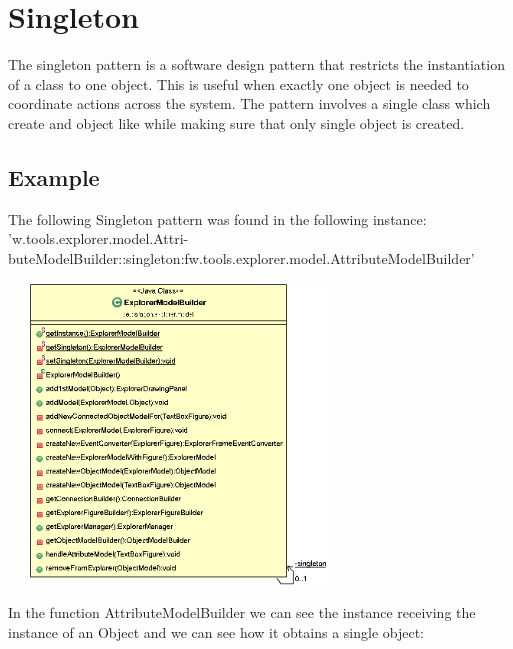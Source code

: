\section{Singleton}

The singleton pattern is a software design pattern that restricts the instantiation of a class to one object. This is useful when exactly one object is needed to coordinate actions across the system. The pattern involves a single class which create and object like while making sure that only single object is created.

\subsection*{Example}


The following Singleton pattern was found in the following instance: 'w.tools.explorer.model.Attri-
buteModelBuilder::singleton:fw.tools.explorer.model.AttributeModelBuilder'

\begin{center}
\includegraphics[width=9cm, height=8cm]{images/Singleton.png}
\end{center}


In the function AttributeModelBuilder we can see the instance receiving the instance of an Object and we can see how it obtains a single object:




